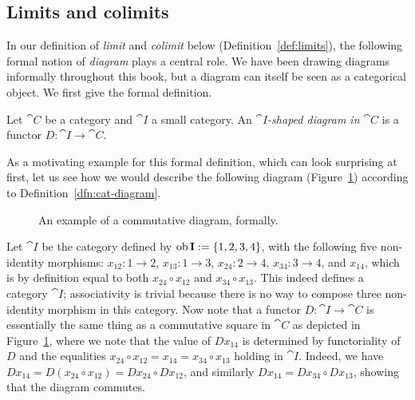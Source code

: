 \subsection*{Limits and colimits}
In our definition of \emph{limit} and \emph{colimit} below (Definition~\ref{def:limits}), the following formal notion of \emph{diagram} plays a central role. We have been drawing diagrams informally throughout this book, but a diagram can itself be seen as a categorical object. We first give the formal definition.
\begin{definition}\label{dfn:cat-diagram}
  Let $\cat{C}$ be a category and $\cat{I}$ a small category. An \emph{$\cat{I}$-shaped diagram in $\cat{C}$} is a functor $D \colon \cat{I} \to \cat{C}$.
  \end{definition}

As a motivating example for this formal definition, which can look surprising at first, let us see how we would describe the following diagram (Figure~\ref{fig:square-diag}) according to Definition~\ref{dfn:cat-diagram}. 
\begin{figure}[htp]
\begin{center}
\end{center}
\caption{An example of a commutative diagram, formally.} 
\label{fig:square-diag}
\end{figure}

Let $\cat{I}$ be the category defined by $\operatorname{\mathrm{ob}} \mathbf{I}  := \{1, 2, 3, 4\}$, with the following five non-identity morphisms: $x_{12} \colon 1 \to 2$, $x_{13} \colon 1 \to 3$, $x_{24} \colon 2 \to 4$, $x_{34} \colon 3 \to 4$, and $x_{14}$, which is by definition equal to both $x_{24} \circ x_{12}$ and $x_{34} \circ x_{13}$. This indeed defines a category $\cat{I}$; associativity is trivial because there is no way to compose three non-identity morphism in this category. Now note that a functor $D \colon \cat{I} \to \cat{C}$ is essentially the same thing as a commutative square in $\cat{C}$ as depicted in Figure~\ref{fig:square-diag}, where we note that the value of $Dx_{14}$ is determined by functoriality of $D$ and the equalities $x_{24} \circ x_{12} = x_{14} = x_{34} \circ x_{13}$ holding in $\cat{I}$. Indeed, we have $Dx_{14} = D(x_{24} \circ x_{12}) = Dx_{24} \circ Dx_{12}$, and similarly $Dx_{14} = Dx_{34} \circ Dx_{13}$, showing that the diagram commutes. 

